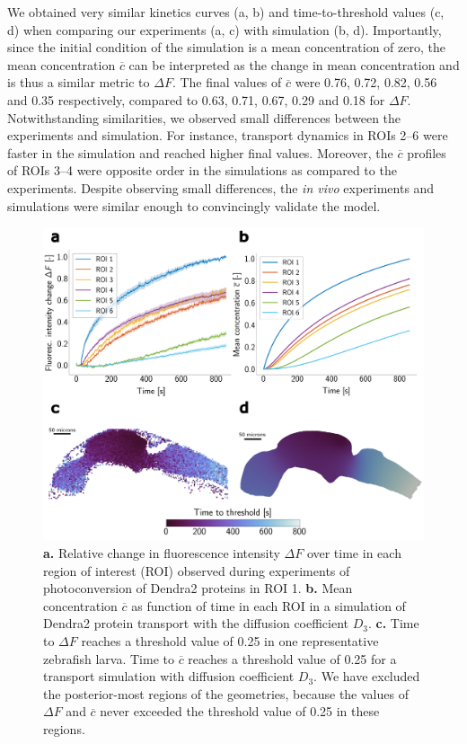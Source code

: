 \documentclass[fleqn]{wlscirep}
\newcommand{\cbar}{\overline{c}}
\begin{document}
We obtained very similar kinetics curves (a, b)
and time-to-threshold values (c, d) when comparing our
experiments (a, c) with
simulation (b, d).
Importantly, since the initial condition of the simulation is a mean concentration of zero,
the mean concentration $\cbar$ can be interpreted as the change in mean concentration and is thus a similar metric to $\Delta F$.
The final values of $\cbar$ were 0.76, 0.72, 0.82, 0.56 and 0.35 respectively,
compared to 0.63, 0.71, 0.67, 0.29 and 0.18 for $\Delta F$.
Notwithstanding similarities, we observed small differences between the experiments and simulation.
For instance, transport dynamics in ROIs 2--6 were faster in the simulation and reached higher final values.
Moreover, the $\cbar$ profiles of ROIs 3--4 were opposite order in the simulations as compared to the experiments.
Despite observing small differences, the \emph{in vivo} experiments and
simulations were similar enough to convincingly validate the model.
\begin{figure}[H]
    \centering
    \includegraphics[width=\textwidth]{graphics/figure3_compare_experiments_and_simulations.png}
    \caption{\textbf{a.} Relative change in fluorescence intensity $\Delta F$ over time in each region of interest (ROI)
    observed during experiments of photoconversion of Dendra2 proteins in ROI 1.
    \textbf{b.} Mean concentration $\cbar$ as function of time in each ROI in a simulation of Dendra2 protein transport with
    the diffusion coefficient $D_3$.
    \textbf{c.} Time to $\Delta F$ reaches a threshold value of 0.25 in one representative zebrafish larva.
    Time to $\cbar$ reaches a threshold value of 0.25 for a transport simulation with diffusion coefficient $D_3$.
    We have excluded the posterior-most regions of the geometries,
    because the values of $\Delta F$ and $\cbar$ never exceeded the threshold value of 0.25 in these regions.}
    \label{fig:figure3_compare_exp_and_sim_control}
\end{figure}
\end{document}
